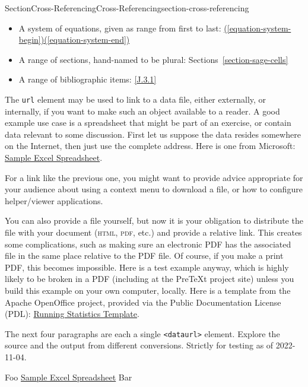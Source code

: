 \documentclass[twoside,10pt,]{article}
\newcommand{\xreffont}{\relax}
\newcommand{\mono}[1]{\texttt{#1}}
\newcommand{\initialism}[1]{\textsc{\MakeLowercase{#1}}}
\numberwithin{equation}{section}
\begin{document}
\begin{sectionptx}{Section}{Cross-Referencing}{}{Cross-Referencing}{}{}{section-cross-referencing}
\begin{itemize}[label=\textbullet]
\item{}A system of equations, given as range from first to last: \hyperref[equation-system-begin]{({\xreffont\ref{equation-system-begin}})\textendash{}({\xreffont\ref{equation-system-end}})}%
\item{}A range of sections, hand-named to be plural: Sections~\hyperref[section-sage-cells]{{\xreffont\ref{section-sage-cells}}\textendash{}{\xreffont\ref{section-cross-referencing}}}%
\item{}A range of bibliographic items: \hyperlink{biblio-judson-AATA}{[{\xreffont J.3.1}\textendash{}{\xreffont 2}]}%
\end{itemize}
%
\par
The \mono{url} element may be used to link to a data file, either externally, or internally, if you want to make such an object available to a reader.  A good example use case is a spreadsheet that might be part of an exercise, or contain data relevant to some discussion.  First let us suppose the data resides somewhere on the Internet, then just use the complete address.  Here is one from Microsoft: \href{http://go.microsoft.com/fwlink/?LinkID=521962}{Sample Excel Spreadsheet}.%
\par
For a link like the previous one, you might want to provide advice appropriate for your audience about using a context menu to download a file, or how to configure helper\slash{}viewer applications.%
\par
You can also provide a file yourself, but now it is your obligation to distribute the file with your document (\initialism{HTML}, \initialism{PDF}, etc.\@) and provide a relative link.  This creates some complications, such as making sure an electronic PDF has the associated file in the same place relative to the PDF file.  Of course, if you make a print PDF, this becomes impossible.  Here is a test example anyway, which is highly likely to be broken in a PDF (including at the PreTeXt project site) unless you build this example on your own computer, locally.  Here is a template from the Apache OpenOffice project, provided via the Public Documentation License (PDL):  \href{data/spreadsheet/runningstatisticstemplate.ots}{Running Statistics Template}.%
\par
The next four paragraphs are each a single \mono{<dataurl>} element.  Explore the source and the output from different conversions.  Strictly for testing as of 2022-11-04.%
\par
Foo \href{http://go.microsoft.com/fwlink/?LinkID=521962}{Sample Excel Spreadsheet} Bar%

\end{sectionptx}
\end{document}
